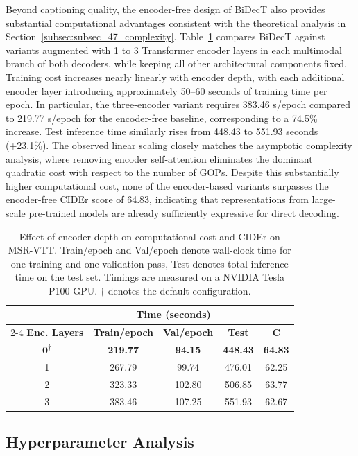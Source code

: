Beyond captioning quality, the encoder-free design of BiDecT also provides substantial computational advantages consistent with the theoretical analysis in Section~\ref{subsec:subsec_47_complexity}. Table~\ref{tab:exp_encoder_layers} compares BiDecT against variants augmented with 1 to 3 Transformer encoder layers in each multimodal branch of both decoders, while keeping all other architectural components fixed. Training cost increases nearly linearly with encoder depth, with each additional encoder layer introducing approximately 50–60 seconds of training time per epoch. In particular, the three-encoder variant requires 383.46 s/epoch compared to 219.77 s/epoch for the encoder-free baseline, corresponding to a 74.5\% increase. Test inference time similarly rises from 448.43 to 551.93 seconds (+23.1\%). The observed linear scaling closely matches the asymptotic complexity analysis, where removing encoder self-attention eliminates the dominant quadratic cost with respect to the number of GOPs. Despite this substantially higher computational cost, none of the encoder-based variants surpasses the encoder-free CIDEr score of 64.83, indicating that representations from large-scale pre-trained models are already sufficiently expressive for direct decoding.

\begin{table}[!t]
\caption{Effect of encoder depth on computational cost and CIDEr on MSR-VTT. Train/epoch and Val/epoch denote wall-clock time for one training and one validation pass, Test denotes total inference time on the test set. Timings are measured on a NVIDIA Tesla P100 GPU. $\dagger$ denotes the default configuration.}
\label{tab:exp_encoder_layers}
\centering
\begin{tabular}{c ccc c}
\hline\hline
 & \multicolumn{3}{c}{\textbf{Time (seconds)}} & \\
\cline{2-4}
\textbf{Enc. Layers} & \textbf{Train/epoch} & \textbf{Val/epoch} & \textbf{Test} & \textbf{C} \\
\hline
$\mathbf{0^\dagger}$ & \textbf{219.77} & \textbf{94.15} & \textbf{448.43} & \textbf{64.83} \\
1 & 267.79 & 99.74 & 476.01 & 62.25 \\
2 & 323.33 & 102.80 & 506.85 & 63.77 \\
3 & 383.46 & 107.25 & 551.93 & 62.67 \\
\hline\hline
\end{tabular}
\end{table}


\subsection{Hyperparameter Analysis}
\label{subsec:subsec_55_hyperparam_analysis}

